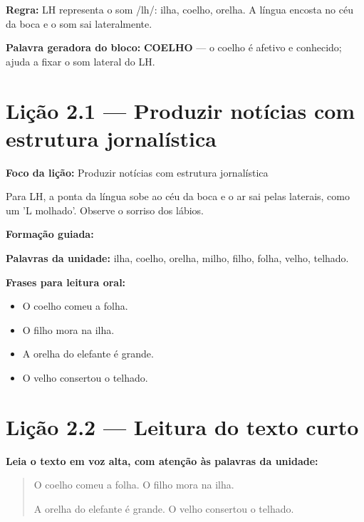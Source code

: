 \textbf{Regra:} LH representa o som /lh/: ilha, coelho, orelha. A língua encosta no céu da boca e o som sai lateralmente.

\textbf{Palavra geradora do bloco:} \textbf{COELHO} --- o coelho é afetivo e conhecido; ajuda a fixar o som lateral do LH.

\section{Lição 2.1 --- Produzir notícias com estrutura jornalística}

\textbf{Foco da lição:} Produzir notícias com estrutura jornalística


\begin{boquinha}
Para LH, a ponta da língua sobe ao céu da boca e o ar sai pelas laterais, como um 'L molhado'. Observe o sorriso dos lábios.
\end{boquinha}

\noindent\textbf{Formação guiada:}

\begin{center}
\end{center}

\noindent\textbf{Palavras da unidade:} ilha, coelho, orelha, milho, filho, folha, velho, telhado.

\noindent\textbf{Frases para leitura oral:}
\begin{itemize}[leftmargin=1.6em]
  \item O coelho comeu a folha.
  \item O filho mora na ilha.
  \item A orelha do elefante é grande.
  \item O velho consertou o telhado.
\end{itemize}

\section{Lição 2.2 --- Leitura do texto curto}

\noindent\textbf{Leia o texto em voz alta, com atenção às palavras da unidade:}


\begin{quote}
O coelho comeu a folha. O filho mora na ilha.

A orelha do elefante é grande. O velho consertou o telhado.
\end{quote}

